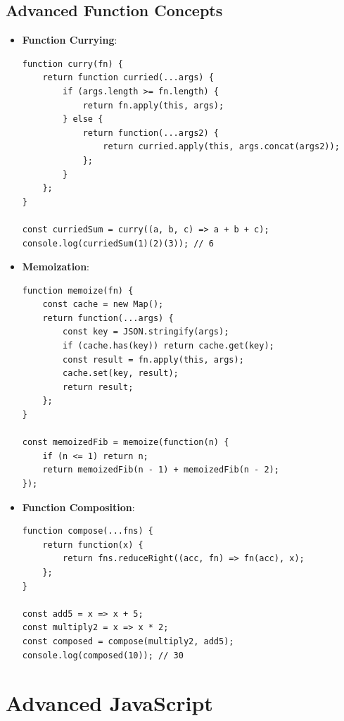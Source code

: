 \documentclass{article}
\begin{document}
\subsection{Advanced Function Concepts}
\begin{itemize}
    \item \textbf{Function Currying}:
    \begin{lstlisting}
function curry(fn) {
    return function curried(...args) {
        if (args.length >= fn.length) {
            return fn.apply(this, args);
        } else {
            return function(...args2) {
                return curried.apply(this, args.concat(args2));
            };
        }
    };
}

const curriedSum = curry((a, b, c) => a + b + c);
console.log(curriedSum(1)(2)(3)); // 6
    \end{lstlisting}
    
    \item \textbf{Memoization}:
    \begin{lstlisting}
function memoize(fn) {
    const cache = new Map();
    return function(...args) {
        const key = JSON.stringify(args);
        if (cache.has(key)) return cache.get(key);
        const result = fn.apply(this, args);
        cache.set(key, result);
        return result;
    };
}

const memoizedFib = memoize(function(n) {
    if (n <= 1) return n;
    return memoizedFib(n - 1) + memoizedFib(n - 2);
});
    \end{lstlisting}
    
    \item \textbf{Function Composition}:
    \begin{lstlisting}
function compose(...fns) {
    return function(x) {
        return fns.reduceRight((acc, fn) => fn(acc), x);
    };
}

const add5 = x => x + 5;
const multiply2 = x => x * 2;
const composed = compose(multiply2, add5);
console.log(composed(10)); // 30
    \end{lstlisting}
\end{itemize}

\section{Advanced JavaScript}
\end{document}
